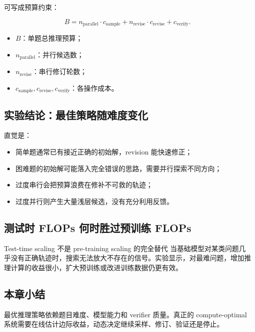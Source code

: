 
可写成预算约束：

$$
B=n_{\mathrm{parallel}}\cdot c_{\mathrm{sample}}
+n_{\mathrm{revise}}\cdot c_{\mathrm{revise}}
+c_{\mathrm{verify}}.
$$

\begin{itemize}
    \item $B$：单题总推理预算；
    \item $n_{\mathrm{parallel}}$：并行候选数；
    \item $n_{\mathrm{revise}}$：串行修订轮数；
    \item $c_{\mathrm{sample}},c_{\mathrm{revise}},c_{\mathrm{verify}}$：各操作成本。
\end{itemize}

\subsection{实验结论：最佳策略随难度变化}



直觉是：

\begin{itemize}
    \item 简单题通常已有接近正确的初始解，revision 能快速修正；
    \item 困难题的初始解可能落入完全错误的思路，需要并行探索不同方向；
    \item 过度串行会把预算浪费在修补不可救的轨迹；
    \item 过度并行则产生大量浅层候选，没有充分利用反馈。
\end{itemize}

\subsection{测试时 FLOPs 何时胜过预训练 FLOPs}


\begin{importantbox}{Test-time scaling 不是 pre-training scaling 的完全替代}
当基础模型对某类问题几乎没有正确轨迹时，搜索无法放大不存在的信号。实验显示，对最难问题，增加推理计算的收益很小，扩大预训练或改进训练数据仍更有效。
\end{importantbox}

\subsection{本章小结}

最优推理策略依赖题目难度、模型能力和 verifier 质量。真正的 compute-optimal 系统需要在线估计边际收益，动态决定继续采样、修订、验证还是停止。

